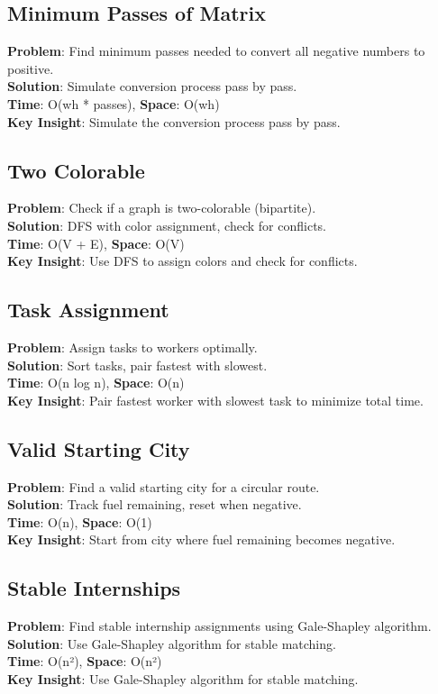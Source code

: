 \documentclass{report}
\begin{document}
\subsection{Minimum Passes of Matrix}
\textbf{Problem}: Find minimum passes needed to convert all negative numbers to positive.\\
\textbf{Solution}: Simulate conversion process pass by pass.\\
\textbf{Time}: O(wh * passes), \textbf{Space}: O(wh)\\
\textbf{Key Insight}: Simulate the conversion process pass by pass.

\subsection{Two Colorable}
\textbf{Problem}: Check if a graph is two-colorable (bipartite).\\
\textbf{Solution}: DFS with color assignment, check for conflicts.\\
\textbf{Time}: O(V + E), \textbf{Space}: O(V)\\
\textbf{Key Insight}: Use DFS to assign colors and check for conflicts.

\subsection{Task Assignment}
\textbf{Problem}: Assign tasks to workers optimally.\\
\textbf{Solution}: Sort tasks, pair fastest with slowest.\\
\textbf{Time}: O(n log n), \textbf{Space}: O(n)\\
\textbf{Key Insight}: Pair fastest worker with slowest task to minimize total time.

\subsection{Valid Starting City}
\textbf{Problem}: Find a valid starting city for a circular route.\\
\textbf{Solution}: Track fuel remaining, reset when negative.\\
\textbf{Time}: O(n), \textbf{Space}: O(1)\\
\textbf{Key Insight}: Start from city where fuel remaining becomes negative.

\subsection{Stable Internships}
\textbf{Problem}: Find stable internship assignments using Gale-Shapley algorithm.\\
\textbf{Solution}: Use Gale-Shapley algorithm for stable matching.\\
\textbf{Time}: O(n²), \textbf{Space}: O(n²)\\
\textbf{Key Insight}: Use Gale-Shapley algorithm for stable matching.
\end{document}
